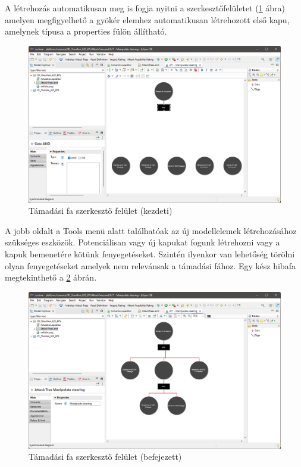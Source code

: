 A létrehozás automatikusan meg is fogja nyitni a szerkesztőfelületet (\ref{fig:05_ateditor_2} ábra) amelyen megfigyelhető a gyökér elemhez automatikusan létrehozott első kapu, amelynek típusa a properties fülön állítható.

\begin{figure}[!ht]
	\centering
	\includegraphics[width=130mm, keepaspectratio]{figures/05_ateditor_2.png}
	\caption{Támadási fa szerkesztő felület (kezdeti)}
	\label{fig:05_ateditor_2}
\end{figure}

A jobb oldalt a Tools menü alatt találhatóak az új modellelemek létrehozásához szükséges eszközök. Potenciálisan vagy új kapukat fogunk létrehozni vagy a kapuk bemenetére kötünk fenyegetéseket. Szintén ilyenkor van lehetőség törölni olyan fenyegetéseket amelyek nem relevánsak a támadási fához. Egy kész hibafa megtekinthető a \ref{fig:05_ateditor_3} ábrán.

\begin{figure}[!ht]
	\centering
	\includegraphics[width=130mm, keepaspectratio]{figures/05_ateditor_3.png}
	\caption{Támadási fa szerkesztő felület (befejezett)}
	\label{fig:05_ateditor_3}
\end{figure}

